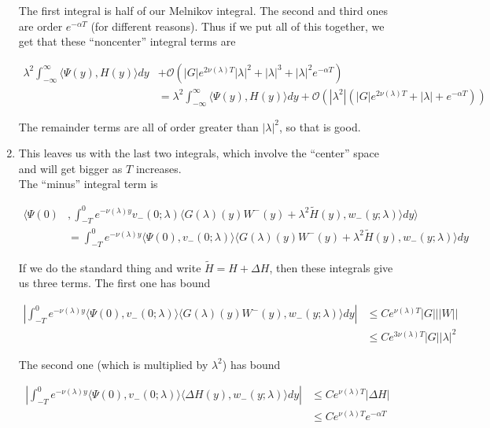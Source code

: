 \documentclass[12pt]{article}
\begin{document}
\begin{enumerate}
The first integral is half of our Melnikov integral. The second and third ones are order $e^{-\alpha T}$ (for different reasons). Thus if we put all of this together, we get that these ``noncenter'' integral terms are

\begin{align*}
\lambda^2 \int_{-\infty}^\infty \langle \Psi(y), H(y) \rangle dy &+ \mathcal{O}( |G| e^{2 \nu(\lambda)T}|\lambda|^2 + |\lambda|^3 + |\lambda|^2 e^{-\alpha T}) \\
&= \lambda^2 \int_{-\infty}^\infty \langle \Psi(y), H(y) \rangle dy + \mathcal{O}( |\lambda^2|(|G| e^{2 \nu(\lambda)T} + |\lambda|+ e^{-\alpha T}))
\end{align*}

The remainder terms are all of order greater than $|\lambda|^2$, so that is good.

\item This leaves us with the last two integrals, which involve the ``center'' space and will get bigger as $T$ increases.\\

The ``minus'' integral term is

\begin{align*}
\langle \Psi(0) &, \int_{-T}^0 
e^{-\nu(\lambda)y} v_-(0; \lambda) \langle G(\lambda)(y)W^-(y) + \lambda^2 \tilde{H}(y), w_-(y; \lambda) \rangle dy \rangle \\
&= \int_{-T}^0 e^{-\nu(\lambda)y} \langle \Psi(0),v_-(0; \lambda) \rangle
\langle G(\lambda)(y)W^-(y) + \lambda^2 \tilde{H}(y), w_-(y; \lambda) \rangle dy 
\end{align*}

If we do the standard thing and write $\tilde{H} = H + \Delta H$, then these integrals give us three terms. The first one has bound

\begin{align*}
\left| \int_{-T}^0 e^{-\nu(\lambda)y} \langle \Psi(0),v_-(0; \lambda) \rangle
\langle G(\lambda)(y)W^-(y), w_-(y; \lambda) \rangle dy \right| 
&\leq C e^{\nu(\lambda)T} |G| ||W|| \\
&\leq C e^{3\nu(\lambda)T} |G| |\lambda|^2
\end{align*}

The second one (which is multiplied by $\lambda^2$) has bound

\begin{align*}
\left| \int_{-T}^0 e^{-\nu(\lambda)y} \langle \Psi(0), v_-(0; \lambda) \rangle
\langle \Delta H(y), w_-(y; \lambda) \rangle dy \right| 
&\leq C e^{\nu(\lambda)T} |\Delta H| \\
&\leq C e^{\nu(\lambda)T} e^{-\alpha T}
\end{align*}


\end{enumerate}
\end{document}
